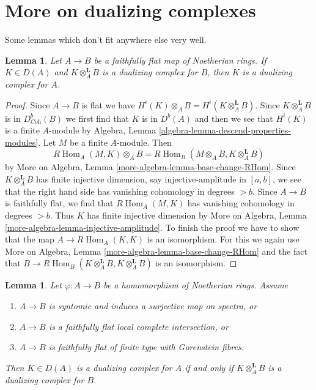 \documentclass{stacks-project}
\theoremstyle{plain}
\newtheorem{lemma}[subsection]{Lemma}
\theoremstyle{definition}
\theoremstyle{remark}
\numberwithin{equation}{subsection}
\def\Hom{\mathop{\mathrm{Hom}}\nolimits}
\begin{document}
\section{More on dualizing complexes}
\label{section-more-dualizing}

\noindent
Some lemmas which don't fit anywhere else very well.

\begin{lemma}
\label{lemma-descent}
Let $A \to B$ be a faithfully flat map of Noetherian rings.
If $K \in D(A)$ and $K \otimes_A^\mathbf{L} B$
is a dualizing complex for $B$, then $K$ is a dualizing complex
for $A$.
\end{lemma}

\begin{proof}
Since $A \to B$ is flat we have
$H^i(K) \otimes_A B = H^i(K \otimes_A^\mathbf{L} B)$.
Since $K \otimes_A^\mathbf{L} B$ is in $D^b_{\textit{Coh}}(B)$
we first find that $K$ is in $D^b(A)$ and then we see that
$H^i(K)$ is a finite $A$-module by
Algebra, Lemma \ref{algebra-lemma-descend-properties-modules}.
Let $M$ be a finite $A$-module. Then
$$
R\Hom_A(M, K) \otimes_A B = R\Hom_B(M \otimes_A B, K \otimes_A^\mathbf{L} B)
$$
by More on Algebra, Lemma \ref{more-algebra-lemma-base-change-RHom}.
Since $K \otimes_A^\mathbf{L} B$ has finite injective dimension,
say injective-amplitude in $[a, b]$, we see that the right hand side
has vanishing cohomology in degrees $> b$.
Since $A \to B$ is faithfully flat, we find
that $R\Hom_A(M, K)$ has vanishing cohomology in degrees $> b$.
Thus $K$ has finite injective dimension by
More on Algebra, Lemma \ref{more-algebra-lemma-injective-amplitude}.
To finish the proof we have to show that the map
$A \to R\Hom_A(K, K)$ is an isomorphism.
For this we again use
More on Algebra, Lemma \ref{more-algebra-lemma-base-change-RHom}
and the fact that
$B \to R\Hom_B(K \otimes_A^\mathbf{L} B, K \otimes_A^\mathbf{L} B)$
is an isomorphism.
\end{proof}

\begin{lemma}
\label{lemma-descent-ascent}
Let $\varphi : A \to B$ be a homomorphism of Noetherian rings. Assume
\begin{enumerate}
\item $A \to B$ is syntomic and induces a surjective map on spectra, or
\item $A \to B$ is a faithfully flat local complete intersection, or
\item $A \to B$ is faithfully flat of finite type with Gorenstein fibres.
\end{enumerate}
Then $K \in D(A)$ is a dualizing complex for $A$ if and only if
$K \otimes_A^\mathbf{L} B$ is a dualizing complex for $B$.
\end{lemma}
\end{document}
